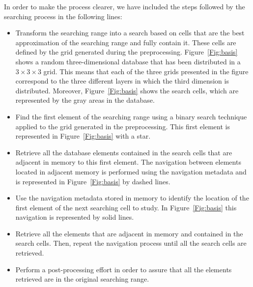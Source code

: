 \documentclass[preprint,12pt]{elsarticle}
\begin{document}
In order to make the process clearer, we have included the steps followed by the searching process in the following lines:
\begin{itemize}
  \item Transform the searching range into a search based on cells that are the best approximation of the searching range and fully contain it. These cells are defined by the grid generated during the preprocessing. Figure~\ref{Fig:basis} shows a random three-dimensional database that has been distributed in a $3\times3\times3$ grid. This means that each of the three grids presented in the figure correspond to the three different layers in which the third dimension is distributed. Moreover, Figure~\ref{Fig:basis} shows the search cells, which are represented by the gray areas in the database.
  \item Find the first element of the searching range using a binary search technique applied to the grid generated in the preprocessing. This first element is represented in Figure~\ref{Fig:basis} with a star.
  \item Retrieve all the database elements contained in the search cells that are adjacent in memory to this first element. The navigation between elements located in adjacent memory is performed using the navigation metadata and is represented in Figure~\ref{Fig:basis} by dashed lines.
  \item Use the navigation metadata stored in memory to identify the location of the first element of the next searching cell to study. In Figure~\ref{Fig:basis} this navigation is represented by solid lines.
  \item Retrieve all the elements that are adjacent in memory and contained in the search cells. Then, repeat the navigation process until all the search cells are retrieved. 
  \item Perform a post-processing effort in order to assure that all the elements retrieved are in the original searching range. 
\end{itemize}
\end{document}
